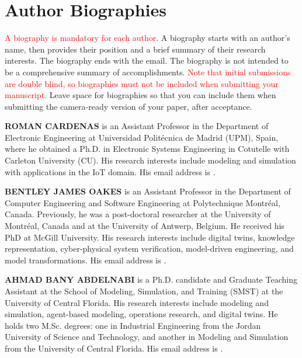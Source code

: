 \documentclass{scspaperproc}
\theoremstyle{scsthe}
\begin{document}
    

    

    \section*{Author Biographies}

    \textcolor{red}{A biography is mandatory for each author}. A biography starts with an author's name, then provides their position and a brief summary of their research interests. The biography ends with the email. The biography is not intended to be a comprehensive summary of accomplishments. \textcolor{red}{Note that initial submissions are double blind, so biographies must not be included when submitting your manuscript.} Leave space for biographies so that you can include them when submitting the camera-ready version of your paper, after acceptance.

    \textbf{\uppercase{Roman Cardenas}} is an Assistant Professor in the Department of Electronic Engineering at Universidad Politécnica de Madrid (UPM), Spain, where he obtained a Ph.D. in Electronic Systems Engineering
    in Cotutelle with Carleton University (CU). His research interests include modeling and simulation with
    applications in the IoT domain. His email address is .

    \textbf{\uppercase{Bentley James Oakes}} is an Assistant Professor in the Department of Computer Engineering and Software Engineering at Polytechnique Montr\'{e}al, Canada. Previously, he was a post-doctoral researcher at the University of Montr\'{e}al, Canada and at the University of Antwerp, Belgium. He received his PhD at McGill University. His research interests include digital twins, knowledge representation, cyber-physical system verification, model-driven engineering, and model transformations. His email address is .

    \textbf{\uppercase{Ahmad Bany Abdelnabi}} is a Ph.D. candidate and Graduate Teaching Assistant at the School of Modeling, Simulation, and Training (SMST) at the University of Central Florida. His research interests include modeling and simulation, agent-based modeling, operations research, and digital twins. He holds two M.Sc. degrees: one in Industrial Engineering from the Jordan University of Science and Technology, and another in Modeling and Simulation from the University of Central Florida. His email address is .
\end{document}
